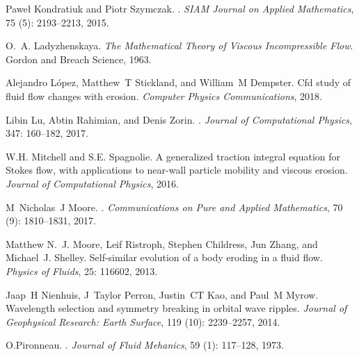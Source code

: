 \documentclass[preprint, 10pt]{elsarticle}
\begin{document}
\begin{thebibliography}{72}
Pawe{\l} Kondratiuk and Piotr Szymczak.
.
\newblock \emph{SIAM Journal on Applied Mathematics}, 75 (5):
  2193--2213, 2015.

O.~A. Ladyzhenskaya.
\newblock \emph{{The Mathematical Theory of Viscous Incompressible Flow}}.
\newblock Gordon and Breach Science, 1963.

Alejandro L{\'o}pez, Matthew~T Stickland, and William~M Dempster.
\newblock Cfd study of fluid flow changes with erosion.
\newblock \emph{Computer Physics Communications}, 2018.

Libin Lu, Abtin Rahimian, and Denis Zorin.
.
\newblock \emph{Journal of Computational Physics}, 347: 160--182,
  2017.

W.H. Mitchell and S.E. Spagnolie.
\newblock A generalized traction integral equation for {S}tokes flow, with
  applications to near-wall particle mobility and viscous erosion.
\newblock \emph{Journal of Computational Physics}, 2016.

M~Nicholas~J Moore.
.
\newblock \emph{Communications on Pure and Applied Mathematics}, 70
  (9): 1810--1831, 2017.

Matthew N.~J. Moore, Leif Ristroph, Stephen Childress, Jun Zhang, and
  Michael~J. Shelley.
\newblock Self-similar evolution of a body eroding in a fluid flow.
\newblock \emph{Physics of Fluids}, 25: 116602, 2013.

Jaap~H Nienhuis, J~Taylor Perron, Justin~CT Kao, and Paul~M Myrow.
\newblock Wavelength selection and symmetry breaking in orbital wave ripples.
\newblock \emph{Journal of Geophysical Research: Earth Surface}, 119
  (10): 2239--2257, 2014.

O.Pironneau.
.
\newblock \emph{Journal of Fluid Mehanics}, 59 (1): 117--128,
  1973.


\end{thebibliography}
\end{document}
